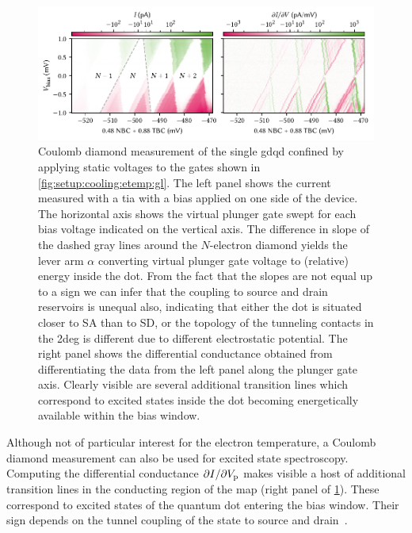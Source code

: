 \begin{figure}
    \centering
    \includegraphics{img/pdf/setup/diamonds}
    \caption[]{
        Coulomb diamond measurement of the single \gls{gdqd} confined by applying static voltages to the gates shown in \cref{fig:setup:cooling:etemp:gl}.
        The left panel shows the current measured with a \gls{tia} with a bias applied on one side of the device.
        The horizontal axis shows the virtual plunger gate swept for each bias voltage indicated on the vertical axis.
        The difference in slope of the dashed gray lines around the $N$-electron diamond yields the lever arm $\alpha$ converting virtual plunger gate voltage to (relative) energy inside the dot.
        From the fact that the slopes are not equal up to a sign we can infer that the coupling to source and drain reservoirs is unequal also, indicating that either the dot is situated closer to SA than to SD, or the topology of the tunneling contacts in the \gls{2deg} is different due to different electrostatic potential.
        The right panel shows the differential conductance obtained from differentiating the data from the left panel along the plunger gate axis.
        Clearly visible are several additional transition lines which correspond to excited states inside the dot becoming energetically available within the bias window.
    }
    \label{fig:setup:cooling:etemp:diamonds}
\end{figure}

Although not of particular interest for the electron temperature, a Coulomb diamond measurement can also be used for excited state spectroscopy.
Computing the differential conductance $\partial I/\partial V_{\mathrm{p}}$ makes visible a host of additional transition lines in the conducting region of the map (right panel of \cref{fig:setup:cooling:etemp:diamonds}).
These correspond to excited states of the quantum dot entering the bias window.
Their sign depends on the tunnel coupling of the state to source and drain~\cite{Ihn2009}.

